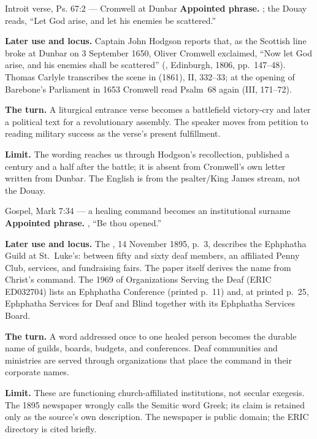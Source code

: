 \begin{afterlife}{Introit verse, Ps. 67:2 --- Cromwell at Dunbar}
\textbf{Appointed phrase.} ;
the Douay reads, ``Let God arise, and let his enemies be scattered.''

\textbf{Later use and locus.} Captain John Hodgson reports that, as the
Scottish line broke at Dunbar on 3 September 1650, Oliver Cromwell exclaimed,
``Now let God arise, and his enemies shall be scattered'' (, Edinburgh, 1806, pp.~147--48). Thomas Carlyle transcribes the scene
in  (1861), II, 332--33; at the
opening of Barebone's Parliament in 1653 Cromwell read Psalm~68 again (III,
171--72).

\textbf{The turn.} A liturgical entrance verse becomes a battlefield
victory-cry and later a political text for a revolutionary assembly. The
speaker moves from petition to reading military success as the verse's
present fulfillment.

\textbf{Limit.} The wording reaches us through Hodgson's recollection,
published a century and a half after the battle; it is absent from Cromwell's
own letter written from Dunbar.
The English is from the psalter/King James stream, not the Douay.
\end{afterlife}

\begin{afterlife}{Gospel, Mark 7:34 --- a healing command becomes an institutional surname}
\textbf{Appointed phrase.} , ``Be thou opened.''

\textbf{Later use and locus.} The , 14 November 1895,
p.~3, describes the Ephphatha Guild at St.~Luke's: between fifty and sixty
deaf members, an affiliated Penny Club, services, and fundraising fairs. The
paper itself derives the name from Christ's command. The 1969  of Organizations Serving the Deaf (ERIC ED032704)
lists an Ephphatha Conference (printed p.~11) and, at printed p.~25,
Ephphatha Services for Deaf and Blind together with its Ephphatha Services
Board.

\textbf{The turn.} A word addressed once to one healed person becomes the
durable name of guilds, boards, budgets, and conferences. Deaf communities
and ministries are served through organizations that place the command in
their corporate names.

\textbf{Limit.} These are functioning church-affiliated institutions, not
secular exegesis. The 1895 newspaper wrongly calls the Semitic word Greek;
its claim is retained only as the source's own description. The newspaper is
public domain; the ERIC directory is cited briefly.
\end{afterlife}
